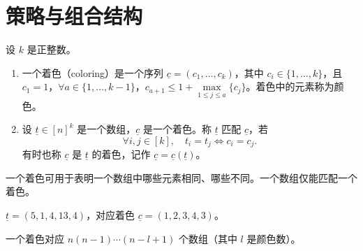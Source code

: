 \theoremstyle{plain}\newtheorem*{1}{习题1}
\theoremstyle{plain}\newtheorem*{2}{习题2}
\theoremstyle{plain}\newtheorem*{3}{习题3}
\theoremstyle{plain}\newtheorem*{4}{习题4}
\theoremstyle{plain}\newtheorem*{5}{习题5}
\theoremstyle{plain}\newtheorem*{6}{习题6}
\theoremstyle{plain}\newtheorem*{7}{习题7}
\theoremstyle{plain}\newtheorem*{8}{习题8}
\theoremstyle{plain}\newtheorem*{9}{习题9}
\theoremstyle{plain}\newtheorem*{10}{习题10}
\def\E{\mathbb{E}}
\def\R{\mathbb{R}}
\def\N{\mathbb{N}}
\def\B{\mathcal{B}}
\def\M{\mathcal{M}}
\def\prob{\mathbb{P}}
\def\t{\underline{t}}
\def\c{\underline{c}}
\newtheorem{prop}{性质}

\section{策略与组合结构}

\begin{definition}
设 $k$ 是正整数。
\begin{enumerate}
\item 一个着色（coloring）是一个序列 $\underline{c} = (c_1, \ldots, c_k)$，其中 $c_i \in \{1, \ldots, k\}$，且 $c_1 = 1$，$\forall a \in \{1, \ldots, k-1\}$，$c_{a+1} \leq 1 + \max\limits_{1 \leq j \leq a}\{ c_j\}$。着色中的元素称为颜色。
\item 设 $\underline{t }\in [n]^k$ 是一个数组，$\underline{c}$ 是一个着色。称 $\underline{t}$ 匹配 $\underline{c}$，若
\[
\forall i, j \in [k], \quad t_i = t_j \iff c_i = c_j.
\]
有时也称 $\underline{c}$ 是 $\underline{t}$ 的着色，记作 $\underline{c} = \underline{c}(\underline{t})$。
\end{enumerate}
\end{definition}

一个着色可用于表明一个数组中哪些元素相同、哪些不同。一个数组仅能匹配一个着色。

\begin{example}
    $\underline{t} = (5, 1, 4, 13, 4)$，对应着色 $\underline{c} = (1, 2, 3, 4, 3)$。

一个着色对应 $n(n-1)\cdots(n-l+1)$ 个数组（其中 $l$ 是颜色数）。
\end{example}


